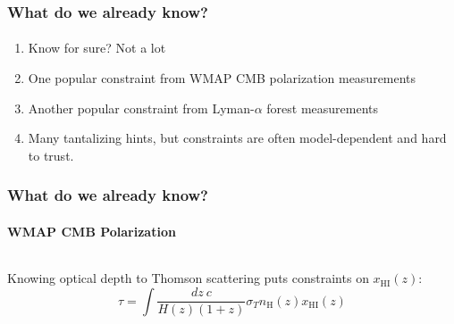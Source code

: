 \documentclass{beamer}
\begin{document}
\begin{frame}
\frametitle{What do we already know?}
\framesubtitle{}
\begin{enumerate}[-]
\item Know for sure? Not a lot
\item One popular constraint from WMAP CMB polarization measurements 
\item Another popular constraint from Lyman-$\alpha$ forest measurements
\item Many tantalizing hints, but constraints are often model-dependent and hard to trust.
\end{enumerate}
\end{frame}


\begin{frame}
\frametitle{What do we already know?}
\framesubtitle{WMAP CMB Polarization}
\begin{columns}[l]
\column{1.8in}
\column{1.8in}
\end{columns}
\newline Knowing optical depth to Thomson scattering puts constraints on $x_{\text{HI}}(z)$:
\begin{equation}
\tau = \int \frac{ dz\ c}{H(z)(1+z)} \sigma_{T} n_{\text{H}}(z) x_{\text{HI}}(z)
\end{equation}
\end{frame}

\end{document}

